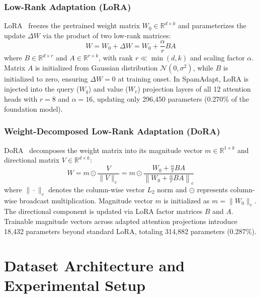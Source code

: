 \documentclass[conference]{IEEEtran}
\begin{document}
\subsubsection{Low-Rank Adaptation (LoRA)}
LoRA~\cite{hu2022lora} freezes the pretrained weight matrix $W_0 \in \mathbb{R}^{d \times k}$ and parameterizes the update $\Delta W$ via the product of two low-rank matrices:
\begin{equation}
    W = W_0 + \Delta W = W_0 + \frac{\alpha}{r} B A
    \label{eq:lora}
\end{equation}
where $B \in \mathbb{R}^{d \times r}$ and $A \in \mathbb{R}^{r \times k}$, with rank $r \ll \min(d, k)$ and scaling factor $\alpha$. Matrix $A$ is initialized from Gaussian distribution $\mathcal{N}(0, \sigma^2)$, while $B$ is initialized to zero, ensuring $\Delta W = 0$ at training onset. In SpamAdapt, LoRA is injected into the query ($W_q$) and value ($W_v$) projection layers of all 12 attention heads with $r=8$ and $\alpha=16$, updating only 296,450 parameters (0.270\% of the foundation model).

\subsubsection{Weight-Decomposed Low-Rank Adaptation (DoRA)}
DoRA~\cite{liu2024dora} decomposes the weight matrix into its magnitude vector $m \in \mathbb{R}^{1 \times k}$ and directional matrix $V \in \mathbb{R}^{d \times k}$:
\begin{equation}
    W = m \odot \frac{V}{\|V\|_c} = m \odot \frac{W_0 + \frac{\alpha}{r} B A}{\left\| W_0 + \frac{\alpha}{r} B A \right\|_c}
    \label{eq:dora}
\end{equation}
where $\|\cdot\|_c$ denotes the column-wise vector $L_2$ norm and $\odot$ represents column-wise broadcast multiplication. Magnitude vector $m$ is initialized as $m = \|W_0\|_c$. The directional component is updated via LoRA factor matrices $B$ and $A$. Trainable magnitude vectors across adapted attention projections introduce 18,432 parameters beyond standard LoRA, totaling 314,882 parameters (0.287\%).

\section{Dataset Architecture and Experimental Setup}
\label{sec:datasets}
\end{document}
